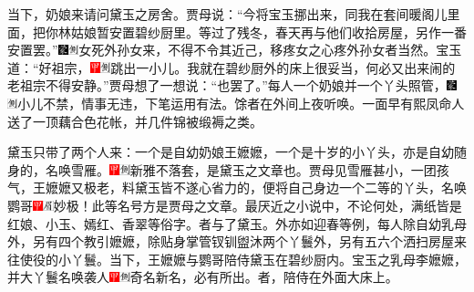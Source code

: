 当下，奶娘来请问黛玉之房舍。贾母说：``今将宝玉挪出来，同我在套间暖阁儿里面，把你林姑娘暂安置碧纱厨里。等过了残冬，春天再与他们收拾房屋，另作一番安置罢。''{\includegraphics[width=3mm]{../Images/00006}\includegraphics[width=3mm]{../Images/00011}\footnotesize \kaishu 女死外孙女来，不得不令其近己，移疼女之心疼外孙女者当然。}宝玉道：``好祖宗，{\includegraphics[width=3mm]{../Images/00002}\includegraphics[width=3mm]{../Images/00011}\footnotesize \kaishu 跳出一小儿。}我就在碧纱厨外的床上很妥当，何必又出来闹的老祖宗不得安静。''贾母想了一想说：``也罢了。''每人一个奶娘并一个丫头照管，{\includegraphics[width=3mm]{../Images/00006}\includegraphics[width=3mm]{../Images/00011}\footnotesize \kaishu 小儿不禁，情事无违，下笔运用有法。}馀者在外间上夜听唤。一面早有熙凤命人送了一顶藕合色花帐，并几件锦被缎褥之类。

黛玉只带了两个人来：一个是自幼奶娘王嬷嬷，一个是十岁的小丫头，亦是自幼随身的，名唤雪雁。{\includegraphics[width=3mm]{../Images/00002}\includegraphics[width=3mm]{../Images/00011}\footnotesize \kaishu 新雅不落套，是黛玉之文章也。}贾母见雪雁甚小，一团孩气，王嬷嬷又极老，料黛玉皆不遂心省力的，便将自己身边一个二等的丫头，名唤鹦哥{\includegraphics[width=3mm]{../Images/00002}\includegraphics[width=3mm]{../Images/00010}\footnotesize \kaishu 妙极！此等名号方是贾母之文章。最厌近之小说中，不论何处，满纸皆是红娘、小玉、嫣红、香翠等俗字。}者与了黛玉。外亦如迎春等例，每人除自幼乳母外，另有四个教引嬷嬷，除贴身掌管钗钏盥沐两个丫鬟外，另有五六个洒扫房屋来往使役的小丫鬟。当下，王嬷嬷与鹦哥陪侍黛玉在碧纱厨内。宝玉之乳母李嬷嬷，并大丫鬟名唤袭人{\includegraphics[width=3mm]{../Images/00002}\includegraphics[width=3mm]{../Images/00011}\footnotesize \kaishu 奇名新名，必有所出。}者，陪侍在外面大床上。

